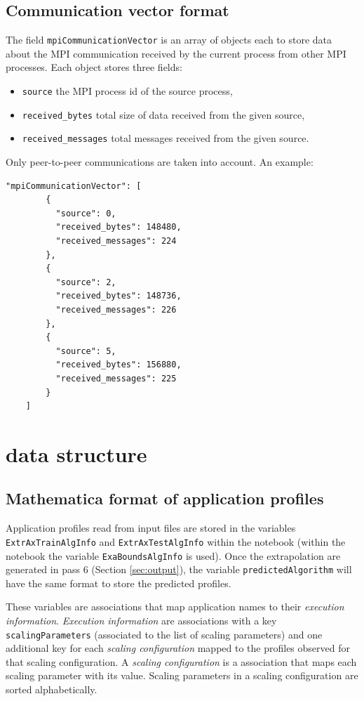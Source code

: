 \documentclass[a4paper, 10pt]{article}
\begin{document}
\subsection{Communication vector format}
\label{sec:pisaCommVector}
The field \verb!mpiCommunicationVector! is an array of objects each to store data about the MPI communication received by the
current process from other MPI processes. Each object stores three fields:
\begin{itemize}
 \item \verb!source! the MPI process id of the source process,
 \item \verb!received_bytes! total size of data received from the given source,
 \item \verb!received_messages! total messages received from the given source.
\end{itemize}

Only peer-to-peer communications are taken into account.
An example:
\begin{Verbatim}[obeytabs, tabsize=2, frame=lines]
	"mpiCommunicationVector": [
		{
		  "source": 0,
		  "received_bytes": 148480,
		  "received_messages": 224
		},
		{
		  "source": 2,
		  "received_bytes": 148736,
		  "received_messages": 226
		},
		{
		  "source": 5,
		  "received_bytes": 156880,
		  "received_messages": 225
		}
	]
\end{Verbatim}

\section{\ex data structure}

\subsection{Mathematica format of application profiles}
\label{apx:matheAppFormat}

Application profiles read from input files are stored in the variables \verb!ExtrAxTrainAlgInfo! and \verb!ExtrAxTestAlgInfo!
within the \ex notebook (within the \eb notebook the variable \verb!ExaBoundsAlgInfo! is used). Once the extrapolation
are generated in pass 6 (Section \ref{sec:output}), the variable \verb!predictedAlgorithm! will have the same format
to store the predicted profiles.

These variables are \mathe associations that map application names to their \textit{execution information}.
\textit{Execution information} are \mathe associations with a key \verb!scalingParameters! (associated to the list of scaling parameters)
and one additional key for each \textit{scaling configuration} mapped to the profiles observed for that scaling configuration.
A \textit{scaling configuration} is a \mathe association that maps each scaling parameter with its value. Scaling parameters in
a scaling configuration are sorted alphabetically.
\end{document}
